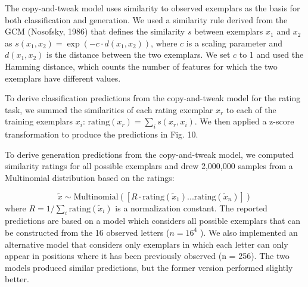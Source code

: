 \documentclass[12pt]{article} \usepackage[letterpaper, margin=1in,
\begin{document}
\begin{displayquote}

The copy-and-tweak model uses similarity to observed exemplars as the basis for
both classification and generation. We used a similarity rule derived from the
GCM (Nosofsky, 1986) that defines the similarity $s$ between exemplars $x_1$ and
$x_2$ as $s(x_1,x_2) = \exp (-c \cdot d(x_1,x_2))$, where $c$ is a scaling
parameter and $d(x_1,x_2)$ is the distance between the two exemplars. We set $c$
to 1 and used the Hamming distance, which counts the number of features for
which the two exemplars have different values.

To derive classification predictions from the copy-and-tweak model for the
rating task, we summed the similarities of each rating exemplar $x_r$ to each of
the training exemplars $x_i$: $\text{rating}(x_r) =\sum_i{s(x_r,x_i)}$. We then
applied a z-score transformation to produce the predictions in Fig. 10.

To derive generation predictions from the copy-and-tweak model, we computed
similarity ratings for all possible exemplars and drew 2,000,000 samples from a
Multinomial distribution based on the ratings:

\begin{equation} \widetilde{x} \sim \text{Multinomial}([R \cdot
\text{rating}(\widetilde{x}_1) ... \text{rating}(\widetilde{x}_n)])
\end{equation}
% 
where $R = 1/\sum_i{\text{rating}(\widetilde{x}_i)}$ is a normalization
constant. The reported predictions are based on a model which considers all
possible exemplars that can be constructed from the 16 observed letters ($n =
16^4$ ). We also implemented an alternative model that considers only exemplars
in which each letter can only appear in positions where it has been previously
observed (n = 256). The two models produced similar predictions, but the former
version performed slightly better.
\end{displayquote}
\end{document}
